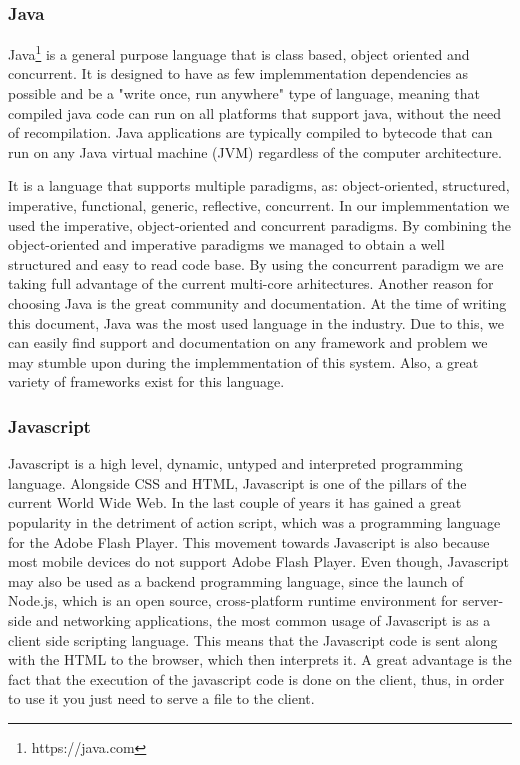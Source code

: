 \subsubsection{Java}
\label{sec:programming-languages-java}
Java\footnote{https://java.com} is a general purpose language that is class based, object oriented and concurrent. 
It is designed to have as few implemmentation dependencies as possible and be a "write once, run anywhere" type of language, meaning that compiled java code can run on all platforms that support java, without the need of recompilation.
Java applications are typically compiled to bytecode that can run on any Java virtual machine (JVM) regardless of the computer architecture.

It is a language that supports multiple paradigms, as:  object-oriented, structured, imperative, functional, generic, reflective, concurrent. In our implemmentation we used the imperative, object-oriented and concurrent paradigms. By combining the object-oriented and imperative paradigms we managed to obtain a well structured and easy to read code base. By using the concurrent paradigm we are taking full advantage of the current multi-core arhitectures.
Another reason for choosing Java is the great community and documentation. At the time of writing this document, Java was the most used language in the industry. Due to this, we can easily find support and documentation on any framework and problem we may stumble upon during the implemmentation of this system. Also, a great variety of frameworks exist for this language.

\subsubsection{Javascript}
\label{sec:programming-languages-javascript}
Javascript is a high level, dynamic, untyped and interpreted programming language. Alongside CSS and HTML, Javascript is one of the pillars of the current World Wide Web. In the last couple of years it has gained a great popularity in the detriment of action script, which was a programming language for the Adobe Flash Player. This movement towards Javascript is also because most mobile devices do not support Adobe Flash Player.
Even though, Javascript may also be used as a backend programming language, since the launch of Node.js, which is  an open source, cross-platform runtime environment for server-side and networking applications, the most common usage of Javascript is as a client side scripting language. This means that the Javascript code is sent along with the HTML to the browser, which then interprets it. A great advantage is the fact that the execution of the javascript code is done on the client, thus, in order to use it you just need to serve a file to the client.

